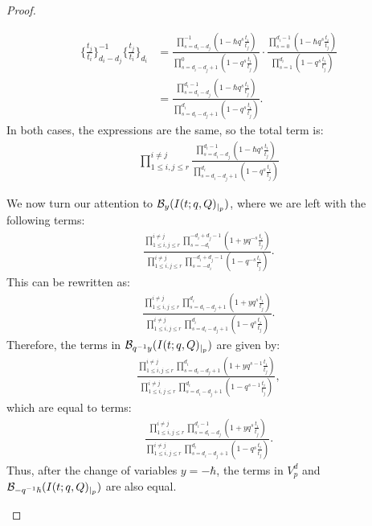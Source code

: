 \documentclass[10pt,a4paper]{amsart}
\begin{document}
\begin{proof}
\begin{itemize}
        \begin{align*}
            \{\frac{t_j}{t_i}\}_{d_i-d_j}^{-1}\{\frac{t_j}{t_i}\}_{d_i} &= \frac{\prod_{s=d_i-d_j}^{-1}(1-\hbar q^s  \frac{t_i}{t_j})}{\prod_{s=d_i-d_j+1}^0(1-q^s\frac{t_i}{t_j})} \cdot \frac{\prod_{s=0}^{d_i-1}(1- \hbar q^s \frac{t_i}{t_j})}{\prod_{s=1}^{d_i}(1-q^s\frac{t_i}{t_j})}  \\&= \frac{\prod_{s=d_i-d_j}^{d_i-1}(1-\hbar q^s  \frac{t_i}{t_j})}{\prod_{s=d_i-d_j+1}^{d_i}(1-q^s\frac{t_i}{t_j})}.
        \end{align*} 
       In both cases, the expressions are the same, so the total term is:
        \begin{align*}
            \prod_{1 \leq i,j \leq r}^{i \ne j}\frac{\prod_{s=d_i-d_j}^{d_i-1}(1-\hbar q^s \frac{t_i}{t_j})}{\prod_{s=d_i-d_j+1}^{d_i}(1-q^s\frac{t_i}{t_j})}
        \end{align*}
        
        We now turn our attention to $\mathcal{B}_{y}(I(t;q,Q)_{\arrowvert_{p}})$, where we are left with the following terms:
        \begin{align*}
        \frac{\prod_{1 \leq i,j \leq r}^{i \ne j}\prod_{s=-d_i}^{-d_i+d_j-1}(1+yq^{-s}\frac{t_i}{t_j})}{\prod_{1 \leq i,j \leq r}^{i \ne j}\prod_{s=-d_i}^{-d_i+d_j-1}(1-q^{-s}\frac{t_i}{t_j})}.
        \end{align*}
        This can be rewritten as:
        \begin{align*}
        \frac{\prod_{1 \leq i,j \leq r}^{i \ne j}\prod_{s=d_i-d_j+1}^{d_i}(1+yq^{s}\frac{t_i}{t_j})}{\prod_{1 \leq i,j \leq r}^{i \ne j}\prod_{s=d_i-d_j+1}^{d_i}(1-q^{s}\frac{t_i}{t_j})}.
        \end{align*}
        Therefore, the terms in $\mathcal{B}_{q^{-1}y}(I(t;q,Q)_{\arrowvert_{p}})$ are given by:
        \begin{align*}
        \frac{\prod_{1 \leq i,j \leq r}^{i \ne j}\prod_{s=d_i-d_j+1}^{d_i}(1+yq^{s-1}\frac{t_i}{t_j})}{\prod_{1 \leq i,j \leq r}^{i \ne j}\prod_{s=d_i-d_j+1}^{d_i}(1-q^{s-1}\frac{t_i}{t_j})},
        \end{align*}
            which are equal to terms:
            \begin{align*}
                \frac{\prod_{1 \leq i,j \leq r}^{i \ne j}\prod_{s=d_i-d_j}^{d_i-1}(1+yq^{s}\frac{t_i}{t_j})}{\prod_{1 \leq i,j \leq r}^{i \ne j}\prod_{s=d_i-d_j+1}^{d_i}(1-q^{s}\frac{t_i}{t_j})}.
            \end{align*}
            Thus, after the change of variables $y=-\hbar$, the terms in $V_p^d$ and $\mathcal{B}_{-q^{-1}\hbar}(I(t;q,Q)_{\arrowvert_{p}})$ are also equal.
    \end{itemize}
    \end{proof}
\end{document}
